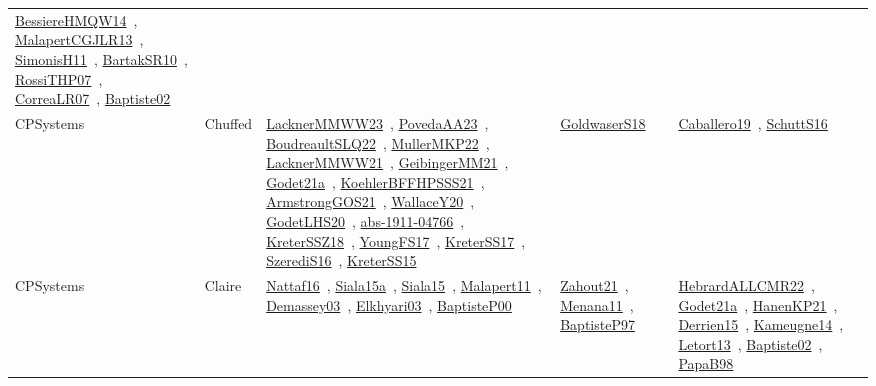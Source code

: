 {\begin{longtable}{lp{3cm}>{\raggedright\arraybackslash}p{6cm}>{\raggedright\arraybackslash}p{6cm}>{\raggedright\arraybackslash}p{8cm}}
\href{../works/BessiereHMQW14.pdf}{BessiereHMQW14}~\cite{BessiereHMQW14}, \href{../works/MalapertCGJLR13.pdf}{MalapertCGJLR13}~\cite{MalapertCGJLR13}, \href{../works/SimonisH11.pdf}{SimonisH11}~\cite{SimonisH11}, \href{../works/BartakSR10.pdf}{BartakSR10}~\cite{BartakSR10}, \href{../works/RossiTHP07.pdf}{RossiTHP07}~\cite{RossiTHP07}, \href{../works/CorreaLR07.pdf}{CorreaLR07}~\cite{CorreaLR07}, \href{../works/Baptiste02.pdf}{Baptiste02}~\cite{Baptiste02}\\
CPSystems & Chuffed & \href{../works/LacknerMMWW23.pdf}{LacknerMMWW23}~\cite{LacknerMMWW23}, \href{../works/PovedaAA23.pdf}{PovedaAA23}~\cite{PovedaAA23}, \href{../works/BoudreaultSLQ22.pdf}{BoudreaultSLQ22}~\cite{BoudreaultSLQ22}, \href{../works/MullerMKP22.pdf}{MullerMKP22}~\cite{MullerMKP22}, \href{../works/LacknerMMWW21.pdf}{LacknerMMWW21}~\cite{LacknerMMWW21}, \href{../works/GeibingerMM21.pdf}{GeibingerMM21}~\cite{GeibingerMM21}, \href{../works/Godet21a.pdf}{Godet21a}~\cite{Godet21a}, \href{../works/KoehlerBFFHPSSS21.pdf}{KoehlerBFFHPSSS21}~\cite{KoehlerBFFHPSSS21}, \href{../works/ArmstrongGOS21.pdf}{ArmstrongGOS21}~\cite{ArmstrongGOS21}, \href{../works/WallaceY20.pdf}{WallaceY20}~\cite{WallaceY20}, \href{../works/GodetLHS20.pdf}{GodetLHS20}~\cite{GodetLHS20}, \href{../works/abs-1911-04766.pdf}{abs-1911-04766}~\cite{abs-1911-04766}, \href{../works/KreterSSZ18.pdf}{KreterSSZ18}~\cite{KreterSSZ18}, \href{../works/YoungFS17.pdf}{YoungFS17}~\cite{YoungFS17}, \href{../works/KreterSS17.pdf}{KreterSS17}~\cite{KreterSS17}, \href{../works/SzerediS16.pdf}{SzerediS16}~\cite{SzerediS16}, \href{../works/KreterSS15.pdf}{KreterSS15}~\cite{KreterSS15} & \href{../works/GoldwaserS18.pdf}{GoldwaserS18}~\cite{GoldwaserS18} & \href{../works/Caballero19.pdf}{Caballero19}~\cite{Caballero19}, \href{../works/SchuttS16.pdf}{SchuttS16}~\cite{SchuttS16}\\
CPSystems & Claire & \href{../works/Nattaf16.pdf}{Nattaf16}~\cite{Nattaf16}, \href{../works/Siala15a.pdf}{Siala15a}~\cite{Siala15a}, \href{../works/Siala15.pdf}{Siala15}~\cite{Siala15}, \href{../works/Malapert11.pdf}{Malapert11}~\cite{Malapert11}, \href{../works/Demassey03.pdf}{Demassey03}~\cite{Demassey03}, \href{../works/Elkhyari03.pdf}{Elkhyari03}~\cite{Elkhyari03}, \href{../works/BaptisteP00.pdf}{BaptisteP00}~\cite{BaptisteP00} & \href{../works/Zahout21.pdf}{Zahout21}~\cite{Zahout21}, \href{../works/Menana11.pdf}{Menana11}~\cite{Menana11}, \href{../works/BaptisteP97.pdf}{BaptisteP97}~\cite{BaptisteP97} & \href{../works/HebrardALLCMR22.pdf}{HebrardALLCMR22}~\cite{HebrardALLCMR22}, \href{../works/Godet21a.pdf}{Godet21a}~\cite{Godet21a}, \href{../works/HanenKP21.pdf}{HanenKP21}~\cite{HanenKP21}, \href{../works/Derrien15.pdf}{Derrien15}~\cite{Derrien15}, \href{../works/Kameugne14.pdf}{Kameugne14}~\cite{Kameugne14}, \href{../works/Letort13.pdf}{Letort13}~\cite{Letort13}, \href{../works/Baptiste02.pdf}{Baptiste02}~\cite{Baptiste02}, \href{../works/PapaB98.pdf}{PapaB98}~\cite{PapaB98}\\

\end{longtable}}
